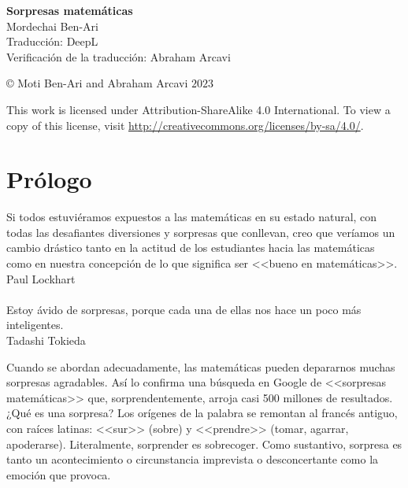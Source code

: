 
\pagestyle{empty}
\begin{center}
\textbf{\LARGE Sorpresas matemáticas}\\
\bigskip\bigskip\bigskip
\textsf{\large Mordechai Ben-Ari}\\
\bigskip\bigskip
\textsf{\large Traducción: DeepL}\\
\bigskip\bigskip
\textsf{\large Verificación de la traducción: Abraham Arcavi}
\end{center}

\vfill

\begin{center}
\copyright{} Moti Ben-Ari and Abraham Arcavi $2023$
\end{center}
 
\begin{small}
\noindent{}This work is licensed under Attribution-ShareAlike 4.0 International. To view a copy of this license, visit \url{http://creativecommons.org/licenses/by-sa/4.0/}.
\end{small}
%

\chapter*{Prólogo}

\begin{flushright}
\parbox{7cm}{
\begin{footnotesize}
\begin{flushright}
Si todos estuviéramos expuestos a las matemáticas en su estado natural, con todas las desafiantes diversiones y sorpresas que conllevan, creo que veríamos un cambio drástico tanto en la actitud de los estudiantes hacia las matemáticas como en nuestra concepción de lo que significa ser <<bueno en matemáticas>>.\\
Paul Lockhart\mbox{}\\\mbox{}\\
Estoy ávido de sorpresas, porque cada una de ellas nos hace un poco más inteligentes.\\
Tadashi Tokieda
\end{flushright}
\end{footnotesize}
}
\end{flushright}

\medskip

Cuando se abordan adecuadamente, las matemáticas pueden depararnos muchas sorpresas agradables. Así lo confirma una búsqueda en Google de <<sorpresas matemáticas>> que, sorprendentemente, arroja casi 500 millones de resultados. ¿Qué es una sorpresa? Los orígenes de la palabra se remontan al francés antiguo, con raíces latinas: <<sur>> (sobre) y <<prendre>> (tomar, agarrar, apoderarse). Literalmente, sorprender es sobrecoger. Como sustantivo, sorpresa es tanto un acontecimiento o circunstancia imprevista o desconcertante como la emoción que provoca.

